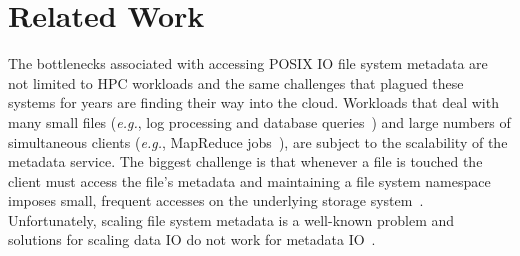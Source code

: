 \section{Related Work} 
\label{sec:related-work}

The bottlenecks associated with accessing POSIX IO file system metadata are not limited
to HPC workloads and the same challenges that plagued these systems for years are
finding their way into the cloud. Workloads that deal with many small files
({\it e.g.}, log processing and database
queries~\cite{thusoo:sigmod2010-facebook-infrastructure}) and large numbers of
simultaneous clients ({\it e.g.}, MapReduce
jobs~\cite{mckusick:acm2010-gfs-evolution}), are subject to the scalability of
the metadata service. The biggest challenge is that whenever a file
is touched the client must access the file's metadata and maintaining a file
system namespace imposes small, frequent accesses on the underlying storage
system~\cite{roselli:atec2000-FS-workloads}.  Unfortunately, scaling file
system metadata is a well-known problem and solutions for scaling data IO do
not work for metadata IO~\cite{roselli:atec2000-FS-workloads,
abad:techreport2012-fstrace, abad:ucc2012-mimesis,
alam:pdsw2011-metadata-scaling, weil:osdi2006-ceph}. 
%
%
